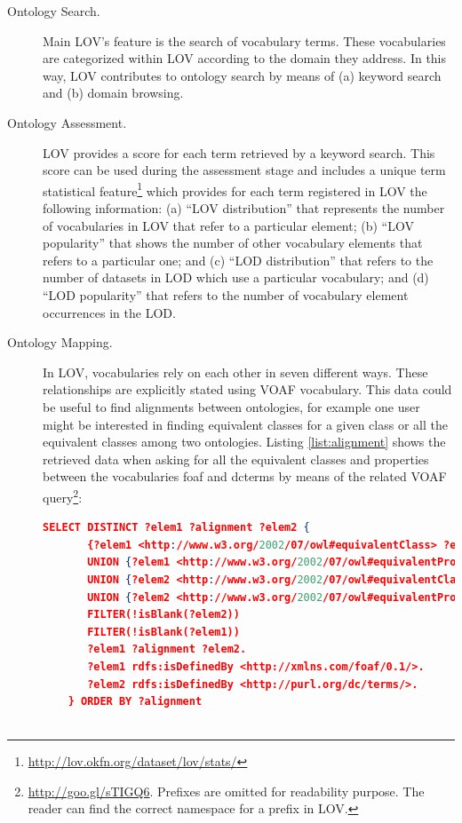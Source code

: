 \documentclass{iosart2c}
\begin{document}
\begin{description}

 \item [Ontology Search.] Main LOV's feature is the search of vocabulary terms. These vocabularies are categorized within LOV according to the domain they address. In this way, LOV contributes to ontology search by means of (a) keyword search and (b) domain browsing.
 \item [Ontology Assessment.] LOV provides a score for each term retrieved by a keyword search. This score can be used during the assessment stage and includes a unique term statistical feature\footnote{\url{http://lov.okfn.org/dataset/lov/stats/}} which provides for each term registered in LOV the following information: (a) ``LOV distribution'' that represents the number of vocabularies in LOV that refer to a particular element; (b) ``LOV popularity'' that shows the number of other vocabulary elements that refers to a particular one; and (c) ``LOD distribution'' that refers to the number of datasets in LOD which use a particular vocabulary; and (d) ``LOD popularity'' that refers to the number of vocabulary element occurrences in the LOD.
 \item [Ontology Mapping.] In LOV, vocabularies rely on each other in seven different ways. These relationships are explicitly stated using VOAF vocabulary. This data could be useful to find alignments between ontologies, for example one user might be interested in finding equivalent classes for a given class or all the equivalent classes among two ontologies. Listing \ref{list:alignment} shows the retrieved data when asking for all the equivalent classes and properties between the vocabularies foaf and dcterms by means of the related VOAF query\footnote{\url{http://goo.gl/sTIGQ6}. Prefixes are omitted for readability purpose. The reader can find the correct namespace for a prefix in LOV.}:
     
\begin{lstlisting}[float=htb,caption={SPARQL query asking for all the equivalent classes and properties between the vocabularies foaf and dcterms. },label=list:alignment, language=json]
    SELECT DISTINCT ?elem1 ?alignment ?elem2 {
	   {?elem1 <http://www.w3.org/2002/07/owl#equivalentClass> ?elem2}
	   UNION {?elem1 <http://www.w3.org/2002/07/owl#equivalentProperty> ?elem2}
	   UNION {?elem2 <http://www.w3.org/2002/07/owl#equivalentClass> ?elem1}
	   UNION {?elem2 <http://www.w3.org/2002/07/owl#equivalentProperty> ?elem1}
	   FILTER(!isBlank(?elem2))
	   FILTER(!isBlank(?elem1))
	   ?elem1 ?alignment ?elem2.
	   ?elem1 rdfs:isDefinedBy <http://xmlns.com/foaf/0.1/>.
	   ?elem2 rdfs:isDefinedBy <http://purl.org/dc/terms/>.
	} ORDER BY ?alignment
	

\end{lstlisting}
\end{description}
\end{document}
